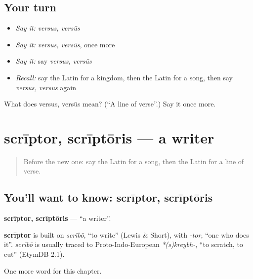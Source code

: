 \subsection*{Your turn}
\begin{itemize}
\raggedright
  \item \emph{Say it:} \emph{versus, versūs}
  \item \emph{Say it:} \emph{versus, versūs}, once more
  \item \emph{Say it:} say \emph{versus, versūs}
  \item \emph{Recall:} say the Latin for a kingdom, then the Latin for a song, then say \emph{versus, versūs} again
\end{itemize}

\begin{tcolorbox}[breakable,colback=teal!4,colframe=teal!35!black,title={Before you move on}]
What does versus, versūs mean? (\textquotedblleft{}A line of verse\textquotedblright{}.) Say it once more.
\end{tcolorbox}
\section[scrīptor, scrīptōris]{scrīptor, scrīptōris — a writer}

\label{lesson:LA-C246-scriptor}



\begin{quote}
Before the new one: say the Latin for a song, then the Latin for a line of verse.
\end{quote}

\subsection*{You'll want to know: scrīptor, scrīptōris}
\textbf{scrīptor, scrīptōris} — \textquotedblleft{}a writer\textquotedblright{}.

\begin{cousinweb}
\textbf{scrīptor} is built on \emph{scrībō}, \textquotedblleft{}to write\textquotedblright{} (Lewis \& Short), with \emph{-tor}, \textquotedblleft{}one who does it\textquotedblright{}. \emph{scrībō} is usually traced to Proto-Indo-European \emph{*(s)kreybh-}, \textquotedblleft{}to scratch, to cut\textquotedblright{} (EtymDB 2.1).
\end{cousinweb}

\begin{grammarlens}[title={What you've built}]
One more word for this chapter.
\end{grammarlens}


